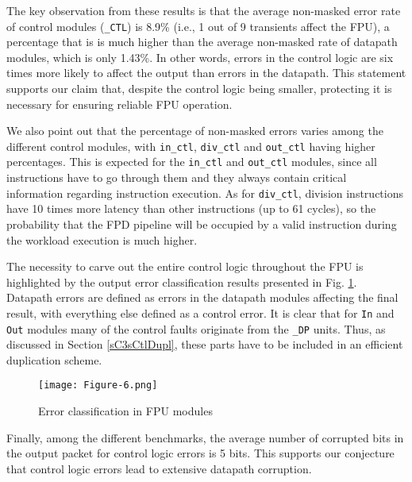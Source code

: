 \documentclass[12pt]{yalephd}
\begin{document}
\begin{table}[!ht]
\begin{center}
\begin{threeparttable}[b]
\begin{tabular}{||r|c|c|c|c|c|c||}
\hline
\hline

\end{tabular}
\end{threeparttable}
\end{center}
\end{table}

The key observation from these results is that the average non-masked error rate of control modules ({\tt\_CTL}) is 8.9\% (i.e., 1 out of 9 transients affect the FPU), a percentage that is is much higher than the average non-masked rate of datapath modules, which is only 1.43\%. In other words, errors in the control logic are six times more likely to affect the output than errors in the datapath. This statement supports our claim that, despite the control logic being smaller, protecting it is necessary for ensuring reliable FPU operation.

We also point out that the percentage of non-masked errors varies among the different control modules, with {\tt in\_ctl}, {\tt div\_ctl} and {\tt out\_ctl} having higher percentages. This is expected for the {\tt in\_ctl} and {\tt out\_ctl} modules, since all instructions have to go through them and they always contain critical information regarding instruction execution. As for {\tt div\_ctl}, division instructions have 10 times more latency than other instructions (up to 61 cycles), so the probability that the FPD pipeline will be occupied by a valid instruction during the workload execution is much higher.

The necessity to carve out the entire control logic throughout the FPU is highlighted by the output error classification results presented in Fig. \ref{sC3fErrClassif}. Datapath errors are defined as errors in the datapath modules affecting the final result, with everything else defined as a control error. It is clear that for {\tt In} and {\tt Out} modules many of the control faults originate from the {\tt\_DP} units. Thus, as discussed in Section \ref{sC3sCtlDupl}, these parts have to be included in an efficient duplication scheme.

\begin{figure}[!ht]
\centering
\texttt{[image: Figure-6.png]}
\caption{Error classification in FPU modules}\label{sC3fErrClassif}
\end{figure}

Finally, among the different benchmarks, the average number of corrupted bits in the output packet for control logic errors is 5 bits. This supports our conjecture that control logic errors lead to extensive datapath corruption.
\end{document}
